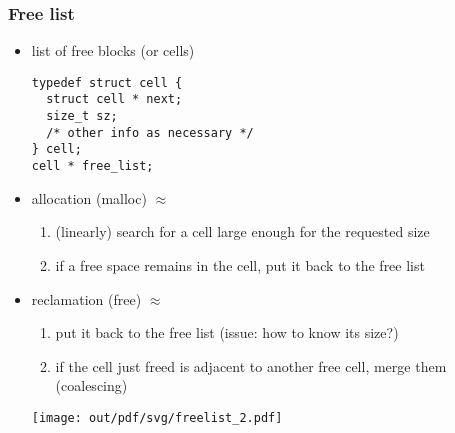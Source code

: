 \documentclass[11pt,dvipdfmx]{beamer}
\begin{document}
\begin{frame}[fragile]
\frametitle{Free list}
\begin{itemize}
\item list of free blocks (or cells)
\begin{lstlisting}
typedef struct cell {
  struct cell * next; 
  size_t sz;
  /* other info as necessary */
} cell;
cell * free_list;
\end{lstlisting}

\item allocation (malloc) $\approx$
  \begin{enumerate}
  \item (linearly) search for a cell large enough for the requested size
  \item if a free space remains in the cell, put it back to the free list
  \end{enumerate}

\item reclamation (free) $\approx$
  \begin{enumerate}
  \item put it back to the free list (issue: how to know its size?)
  \item if the cell just freed is adjacent to another free cell,
    merge them (coalescing)
  \end{enumerate}

\begin{center}
\texttt{[image: out/pdf/svg/freelist\_2.pdf]}
\end{center}

\end{itemize}
\end{frame}
\fi
\end{document}
